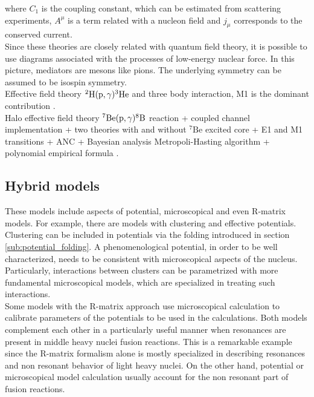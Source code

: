 \documentclass[openany]{book}
\begin{document}
where $C_1$ is the coupling constant, which can be estimated from scattering experiments, $A^\mu $ is a term related with a nucleon field and $j_\mu$ corresponds to the conserved current.  \\

Since these theories are closely related with quantum field theory, it is possible to use diagrams associated with the processes of low-energy nuclear force. In this picture, mediators are mesons like pions. The underlying symmetry can be assumed to be isospin symmetry.  \\

Effective field theory $\mathrm{{}^{2}H(p, \gamma){}^{3}He}$ and three body interaction, M1 is the dominant contribution \cite{sadeghi_khalili_godarzi_2013}. \\

 Halo effective field theory $\mathrm{{}^{7}Be(p, \gamma){}^{8}B}$ reaction + coupled channel implementation + two theories with and without $\mathrm{{}^{7}Be}$ excited core  + E1 and M1 transitions + ANC + Bayesian analysis Metropoli-Hasting algorithm + polynomial empirical formula  \cite{higa_premarathna_rupak_2022}. \\

\subsection{Hybrid models} \label{sub:special_hybrid}

These models include aspects of potential, microscopical and even R-matrix models. For example, there are models with clustering and effective potentials. \\

Clustering can be included in potentials via the folding introduced in section \ref{sub:potential_folding}. A phenomenological potential, in order to be well characterized, needs to be consistent with microscopical aspects of the nucleus.  Particularly, interactions between clusters can be parametrized with more fundamental microscopical models, which are specialized in treating such interactions. \\

Some models with the R-matrix approach use microscopical calculation to calibrate parameters of the potentials to be used in the calculations. Both models complement each other in a particularly useful manner when resonances are present in middle heavy nuclei fusion reactions. This is a remarkable example since the R-matrix formalism alone is mostly specialized in describing resonances and non resonant behavior of light heavy nuclei. On the other hand, potential or microscopical model calculation usually account for the non resonant part of fusion reactions. \\
\end{document}
